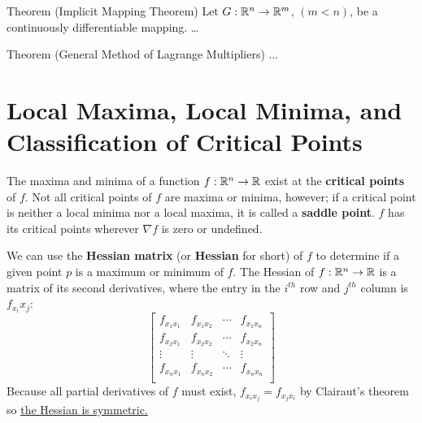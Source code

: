 Theorem (Implicit Mapping Theorem) Let $G : \mathbb{R}^n \to \mathbb{R}^m$, $(m < n)$, be a continuously differentiable mapping. \dots

Theorem (General Method of Lagrange Multipliers) ...







\section{Local Maxima, Local Minima, and Classification of Critical Points}

The maxima and minima of a function $f: \mathbb{R}^n \to \mathbb{R}$ exist at the \textbf{critical points} of $f$. Not all critical points of $f$ are maxima or minima, however; if a critical point is neither a local minima nor a local maxima, it is called a \textbf{saddle point}. $f$ has its critical points wherever $\nabla f$ is zero or undefined.

We can use the \textbf{Hessian matrix} (or \textbf{Hessian} for short) of $f$ to determine if a given point $p$ is a maximum or minimum of $f$. The Hessian of $f: \mathbb{R}^n \to \mathbb{R}$ is a matrix of its second derivatives, where the entry in the $i^{th}$ row and $j^{th}$ column is $f_{x_i}{x_j}$: $$\begin{bmatrix}
f_{x_1x_1} & f_{x_1x_2} & \cdots & f_{x_1x_n}\\
f_{x_2x_1} & f_{x_2x_2} & \cdots & f_{x_2x_n}\\
\vdots     & \vdots     & \ddots & \vdots\\
f_{x_nx_1} & f_{x_nx_2} & \cdots & f_{x_nx_n}\\
\end{bmatrix}$$ Because all partial derivatives of $f$ must exist, $f_{x_ix_j} = f_{x_jx_i}$ by Clairaut's theorem so \uline{the Hessian is symmetric.}

